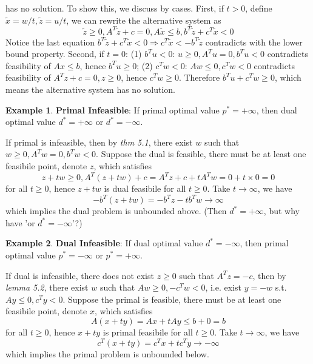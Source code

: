 \documentclass[10pt]{article}
\def\red#1{{\color{red}#1}}
\def\imp{\Rightarrow}
\def\goes{\rightarrow}
\theoremstyle{definition}
\newtheorem{example}{Example}[section]
\begin{document}
has no solution. To show this, we discuss by cases. First, if $t > 0$, define $\tilde{x} = w/t, \tilde{z} = u/t$, 
we can rewrite the alternative system as
\begin{equation*}
	\tilde{z} \ge 0, A^T\tilde{z} + c = 0, A\tilde{x} \le b, b^T\tilde{z} + c^T\tilde{x} < 0
\end{equation*}
Notice the last equation $b^T\tilde{z} + c^T\tilde{x} < 0 \imp c^T\tilde{x} < -b^T\tilde{z}$ contradicts with the 
lower bound property. Second, if $t = 0$: 
(1) $b^Tu < 0$: $u \ge 0, A^Tu = 0, b^Tu < 0$ contradicts feasibility of $Ax \le b$, hence $b^Tu \ge 0$; 
(2) $c^Tw < 0$: $Aw \le 0, c^Tw < 0$ contradicts feasibility of $A^Tz + c = 0, z \ge 0$, hence $c^Tw \ge 0$. 
Therefore $b^Tu + c^Tw \ge 0$, which means the alternative system has no solution.
\qedhere

\begin{example}
	\textbf{Primal Infeasible}: If primal optimal value $p^* = +\infty$, then dual optimal value $d^* = +\infty$ or $d^* = -\infty$.
\end{example}
\proof If primal is infeasible, then by \textit{thm 5.1}, there exist $w$ such that $w \ge 0, A^Tw = 0, b^Tw < 0$. 
Suppose the dual is feasible, there must be at least one feasibile point, denote $z$, which satisfies
\begin{equation*}
	z + tw \ge 0, A^T(z + tw) + c = A^Tz + c + tA^Tw = 0 + t \times 0 = 0
\end{equation*} 
for all $t \ge 0$, hence $z + tw$ is dual feasibile for all $t \ge 0$. Take $t \goes \infty$, we have
\begin{equation*}
	-b^T(z + tw) = -b^Tz - tb^Tw \goes \infty
\end{equation*}
which implies the dual problem is unbounded above. (\red{Then $d^* = + \infty$, but why have 'or $d^* = -\infty$'?})
\qedhere

\begin{example}
	\textbf{Dual Infeasible}: If dual optimal value $d^* = -\infty$, then primal optimal value $p^* = -\infty$ or $p^* = +\infty$.
\end{example}
\proof If dual is infeasible, there does not exist $z \ge 0$ such that $A^Tz = -c$, then by \textit{lemma 5.2}, 
there exist $w$ such that $Aw \ge 0, -c^Tw < 0$, i.e. exist $y = -w$ s.t. $Ay \le 0, c^Ty < 0$.
Suppose the primal is feasible, there must be at least one feasibile point, denote $x$, which satisfies
\begin{equation*}
	A(x + ty) = Ax + tAy \le b + 0 = b
\end{equation*} 
for all $t \ge 0$, hence $x + ty$ is primal feasibile for all $t \ge 0$. Take $t \goes \infty$, we have
\begin{equation*}
	c^T(x + ty) = c^Tx + tc^Ty \goes -\infty
\end{equation*}
which implies the primal problem is unbounded below.
\qedhere
\end{document}
